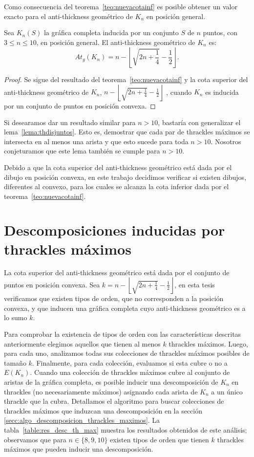   Como consecuencia del teorema~\ref{teo:nuevacotainf} es posible obtener un valor exacto para el anti-thickness geométrico de $K_n$ en posición general.
  \begin{theorem}\label{teo:cotaexacta}
    Sea $K_n(S)$ la gráfica completa inducida por un conjunto $S$ de $n$ puntos, con $3 \leq n \leq 10$, en posición general. El anti-thickness geométrico de $K_n$ es:
    \[ At_g(K_n) = n - \left\lfloor\sqrt{2n + \frac{1}{4}} - \frac{1}{2}\right\rfloor. \]
  \end{theorem}
  \begin{proof}
    Se sigue del resultado del teorema~\ref{teo:nuevacotainf} y
    la cota superior del anti-thickness geométrico de $K_n$,
    $n - \left\lfloor\sqrt{2n + \frac{1}{4}} - \frac{1}{2}\right\rfloor $ , cuando
    $K_n$ es inducida por un conjunto de puntos en posición convexa.
  \end{proof}

  Si desearamos dar un resultado similar para $n > 10$, bastaría con generalizar el
  lema~\ref{lema:thdisjuntos}. Esto es, demostrar que cada par de thrackles máximos se
  intersecta en al menos una arista y que esto sucede para toda $n > 10$. Nosotros
  conjeturamos que este lema también se cumple para $n>10$.

  Debido a que la cota superior del anti-thickness geométrico está dada por
  el dibujo en posición convexa, en este trabajo decidimos verificar si existen
  dibujos, diferentes al convexo, para los cuales se alcanza la cota inferior
  dada por el teorema~\ref{teo:nuevacotainf}.

\section{Descomposiciones inducidas por thrackles máximos}\label{secc:descomposicion_thrackles_maximos}

  La cota superior del anti-thickness geométrico está dada por el conjunto
  de puntos en posición convexa. Sea $k=n - \left\lfloor\sqrt{2n+\frac{1}{4}} -
  \frac{1}{2}\right\rfloor$, en esta tesis verificamos que existen tipos de
  orden, que no corresponden a la posición convexa, y que inducen una gráfica
  completa cuyo anti-thickness geométrico es a lo sumo $k$.

  Para comprobar la existencia de tipos de orden con las características descritas
  anteriormente elegimos aquellos que tienen al menos $k$ thrackles
  máximos. Luego, para cada uno, analizamos todas sus colecciones de thrackles
  máximos posibles de tamaño $k$. Finalmente, para cada colección, evaluamos si
  esta cubre o no a $E(K_n)$. Cuando una colección de thrackles máximos cubre
  al conjunto de aristas de la gráfica completa, es posible inducir una descomposición
  de $K_n$ en thrackles (no necesariamente máximos) asignando cada arista de $K_n$
  a un único thrackle que la cubra. Detallamos el algoritmo para buscar
  colecciones de thrackles máximos que induzcan una descomposición en la sección
  \ref{secc:algo_descomposicion_thrackles_maximos}. La tabla~\ref{table:res_desc_th_max}
  muestra los resultados obtenidos de este análisis; observamos que para
  $n\in \{8,9,10\}$ existen tipos de orden que tienen $k$ thrackles máximos que
  pueden inducir una descomposición.


